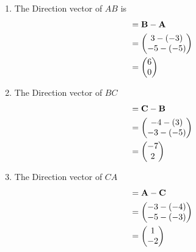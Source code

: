 \solution

\begin{enumerate} 
\item  The Direction vector of $AB$ is \begin{align} &= \mathbf{B} - \mathbf{A} \\
 &= \begin{pmatrix} 3 - (-3)\\ -5 - (-5) \end{pmatrix} \\&= \begin{pmatrix} 6\\ 0 \end{pmatrix}
 \end{align}
 
\item The Direction vector of $BC$ \begin{align}&= \vec{C} - \vec{B}\\
 &= \myvec{ -4 - (3)\\ -3 - (-5) } \\&= \myvec{-7 \\ 2 }
  \end{align}
  
  \item  The Direction vector of $CA$  \begin{align} &= \mathbf{A} - \mathbf{C} \\ 
 &= \begin{pmatrix} -3 - (-4)\\ -5 - (-3) \end{pmatrix} \\&= \begin{pmatrix} 1\\ -2 \end{pmatrix}
  \end{align}
 \end{enumerate}